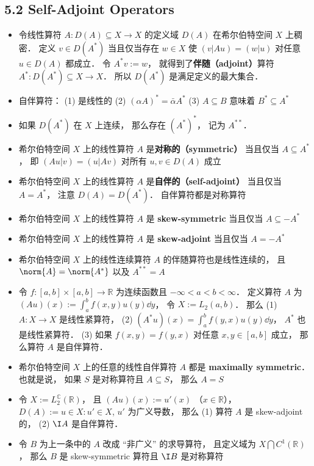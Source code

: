 \subsection{5.2 Self-Adjoint Operators}
\begin{itemize}
\item 令线性算符 $A: D(A) \subseteq X \to X$ 的定义域 $D(A)$ 在希尔伯特空间 $X$ 上稠密． 定义 $v \in D(A^*)$ 当且仅当存在 $w\in X$ 使 $(v|Au) = (w|u)$ 对任意 $u\in D(A)$ 都成立． 令 $A^*v := w$， 就得到了\textbf{伴随（adjoint）}算符 $A^*: D(A^*) \subseteq X \to X$． 所以 $D(A^*)$ 是满足定义的最大集合．

\item 自伴算符： (1) 是线性的 (2) $(\alpha A)^* = \bar \alpha A^*$ (3) $A \subseteq B$ 意味着 $B^* \subseteq A^*$

\item 如果 $D(A^*)$ 在 $X$ 上连续， 那么存在 $(A^*)^*$， 记为 $A^{**}$．

\item 希尔伯特空间 $X$ 上的线性算符 $A$ 是\textbf{对称的（symmetric）} 当且仅当 $A \subseteq A^*$， 即 $(Au|v)=(u|Av)$ 对所有 $u, v\in D(A)$ 成立

\item 希尔伯特空间 $X$ 上的线性算符 $A$ 是\textbf{自伴的（self-adjoint）} 当且仅当 $A = A^*$， 注意 $D(A) = D(A^*)$． 自伴算符都是对称算符

\item 希尔伯特空间 $X$ 上的线性算符 $A$ 是 \textbf{skew-symmetric} 当且仅当 $A \subseteq -A^*$

\item 希尔伯特空间 $X$ 上的线性算符 $A$ 是 \textbf{skew-adjoint} 当且仅当 $A = -A^*$

\item 希尔伯特空间 $X$ 上的线性连续算符 $A$ 的伴随算符也是线性连续的， 且 $\norm{A} = \norm{A^*}$ 以及 $A^{**} = A$

\item 令 $f:[a, b]\times[a,b]\to\mathbb R$ 为连续函数且 $-\infty< a < b < \infty$． 定义算符 $A$ 为 $(Au)(x) := \int_a^b f(x, y)u(y)\dd{y}$， 令 $X := L_2(a, b)$． 那么 (1) $A: X\to X$ 是线性紧算符， (2) $(A^*u)(x) = \int_a^b f(y, x) u(y)\dd{y}$， $A^*$ 也是线性紧算符． (3) 如果 $f(x, y) = f(y, x)$ 对任意 $x, y\in[a, b]$ 成立， 那么算符 $A$ 是自伴算符．

\item 希尔伯特空间 $X$ 上的任意的线性自伴算符 $A$ 都是 \textbf{maximally symmetric}． 也就是说， 如果 $S$ 是对称算符且 $A \subseteq S$， 那么 $A = S$

\item 令 $X := L_2^{\mathbb C}(\mathbb R)$， 且 $(Au)(x) := u'(x)$ （$x \in \mathbb R$）， $D(A) := {u\in X: u'\in X}$, $u'$ 为广义导数， 那么 (1) 算符 $A$ 是 skew-adjoint 的， (2) $\I A$ 是自伴算符．

\item 令 $B$ 为上一条中的 $A$ 改成 “非广义” 的求导算符， 且定义域为 $X \bigcap C^1(\mathbb R)$， 那么 $B$ 是 skew-symmetric 算符且 $\I B$ 是对称算符
\end{itemize}
